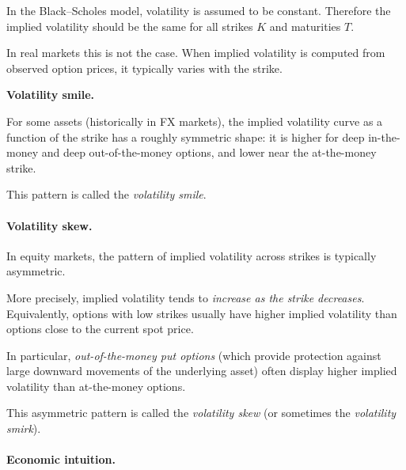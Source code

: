 \documentclass[11pt]{article}
\newcommand{\1}{\mathbf{1}}
\theoremstyle{plain}
\theoremstyle{definition}
\theoremstyle{remark}
\begin{document}
In the Black--Scholes model, volatility is assumed to be constant.
Therefore the implied volatility should be the same for all strikes \(K\)
and maturities \(T\).

In real markets this is not the case.
When implied volatility is computed from observed option prices,
it typically varies with the strike.

\medskip

\textbf{Volatility smile.}

For some assets (historically in FX markets), the implied volatility
curve as a function of the strike has a roughly symmetric shape:
it is higher for deep in-the-money and deep out-of-the-money options,
and lower near the at-the-money strike.

This pattern is called the \emph{volatility smile}.

\begin{center}
\end{center}

\medskip

\paragraph{Volatility skew.}

In equity markets, the pattern of implied volatility across strikes is
typically asymmetric.

More precisely, implied volatility tends to \emph{increase as the strike
decreases}.  
Equivalently, options with low strikes usually have higher implied
volatility than options close to the current spot price.

In particular, \emph{out-of-the-money put options} (which provide
protection against large downward movements of the underlying asset)
often display higher implied volatility than at-the-money options.

This asymmetric pattern is called the \emph{volatility skew}
(or sometimes the \emph{volatility smirk}).

\paragraph{Economic intuition.}
\end{document}
